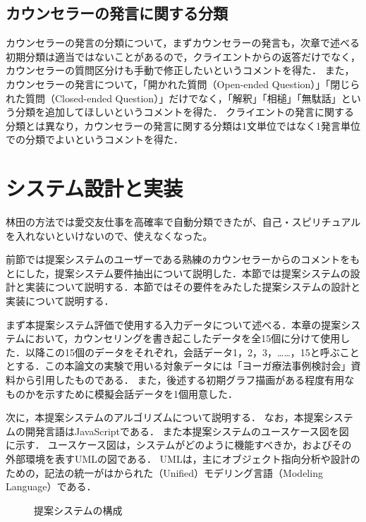 \documentclass[shuuron]{kuee}
\begin{document}
\subsection{カウンセラーの発言に関する分類}

カウンセラーの発言の分類について，まずカウンセラーの発言も，次章で述べる初期分類は適当ではないことがあるので，クライエントからの返答だけでなく，カウンセラーの質問区分けも手動で修正したいというコメントを得た．
また，カウンセラーの発言について，「開かれた質問（Open-ended Question）」「閉じられた質問（Closed-ended Question）」だけでなく，「解釈」「相槌」「無駄話」という分類を追加してほしいというコメントを得た．
クライエントの発言に関する分類とは異なり，カウンセラーの発言に関する分類は1文単位ではなく1発言単位での分類でよいというコメントを得た．







\section{システム設計と実装}



  林田の方法では愛交友仕事を高確率で自動分類できたが、自己・スピリチュアルを入れないといけないので、使えなくなった。

前節では提案システムのユーザーである熟練のカウンセラーからのコメントをもとにした，提案システム要件抽出について説明した．本節では提案システムの設計と実装について説明する．本節ではその要件をみたした提案システムの設計と実装について説明する．

まず本提案システム評価で使用する入力データについて述べる．本章の提案システムにおいて，カウンセリングを書き起こしたデータを全15個に分けて使用した．以降この15個のデータをそれぞれ，会話データ1，2，3，……，15と呼ぶこととする．この本論文の実験で用いる対象データには「ヨーガ療法事例検討会」資料から引用したものである．
また，後述する初期グラフ描画がある程度有用なものかを示すために模擬会話データを1個用意した．

次に，本提案システムのアルゴリズムについて説明する．
なお，本提案システムの開発言語はJavaScriptである．
また本提案システムのユースケース図を図
に示す．
ユースケース図は，システムがどのように機能すべきか，およびその外部環境を表すUMLの図である．
UMLは，主にオブジェクト指向分析や設計のための，記法の統一がはかられた（Unified）モデリング言語（Modeling Language）である．


\begin{figure}
   \begin{center}
   \end{center}
   \caption{提案システムの構成}
   \label{fig:4_2}
 \end{figure}
\end{document}
